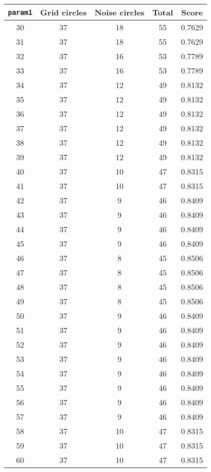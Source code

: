 \documentclass[letterpaper, 12pt]{article}
\begin{document}
\begin{longtable}{|c|c|c|c|c|}
\hline
\textbf{\texttt{param1}} & \textbf{Grid circles} & \textbf{Noise circles} & \textbf{Total} & \textbf{Score} \\
\hline
30 & 37 & 18 & 55 & 0.7629 \\
\hline
31 & 37 & 18 & 55 & 0.7629 \\
\hline
32 & 37 & 16 & 53 & 0.7789 \\
\hline
33 & 37 & 16 & 53 & 0.7789 \\
\hline
34 & 37 & 12 & 49 & 0.8132 \\
\hline
35 & 37 & 12 & 49 & 0.8132 \\
\hline
36 & 37 & 12 & 49 & 0.8132 \\
\hline
37 & 37 & 12 & 49 & 0.8132 \\
\hline
38 & 37 & 12 & 49 & 0.8132 \\
\hline
39 & 37 & 12 & 49 & 0.8132 \\
\hline
40 & 37 & 10 & 47 & 0.8315 \\
\hline
41 & 37 & 10 & 47 & 0.8315 \\
\hline
42 & 37 & 9 & 46 & 0.8409 \\
\hline
43 & 37 & 9 & 46 & 0.8409 \\
\hline
44 & 37 & 9 & 46 & 0.8409 \\
\hline
45 & 37 & 9 & 46 & 0.8409 \\
\hline
46 & 37 & 8 & 45 & 0.8506 \\
\hline
47 & 37 & 8 & 45 & 0.8506 \\
\hline
48 & 37 & 8 & 45 & 0.8506 \\
\hline
49 & 37 & 8 & 45 & 0.8506 \\
\hline
50 & 37 & 9 & 46 & 0.8409 \\
\hline
51 & 37 & 9 & 46 & 0.8409 \\
\hline
52 & 37 & 9 & 46 & 0.8409 \\
\hline
53 & 37 & 9 & 46 & 0.8409 \\
\hline
54 & 37 & 9 & 46 & 0.8409 \\
\hline
55 & 37 & 9 & 46 & 0.8409 \\
\hline
56 & 37 & 9 & 46 & 0.8409 \\
\hline
57 & 37 & 9 & 46 & 0.8409 \\
\hline
58 & 37 & 10 & 47 & 0.8315 \\
\hline
59 & 37 & 10 & 47 & 0.8315 \\
\hline
60 & 37 & 10 & 47 & 0.8315 \\

\end{longtable}
\end{document}

